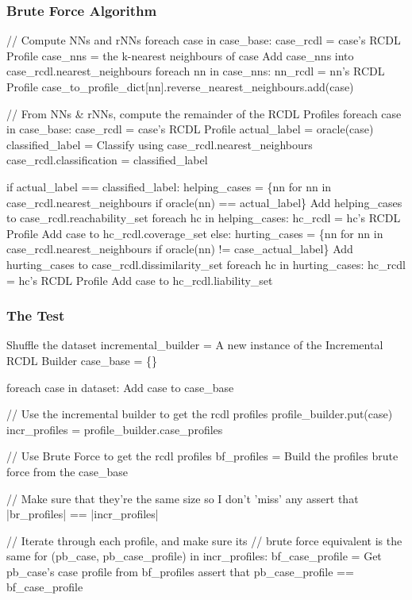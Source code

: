 \documentclass[a4paper,11pt]{report}
\begin{document}
\begin{samepage}
\subsubsection{Brute Force Algorithm}
\begin{code}
// Compute NNs and rNNs
foreach case in case_base:
  case_rcdl = case's RCDL Profile
  case_nns = the k-nearest neighbours of case
  Add case_nns into case_rcdl.nearest_neighbours
  foreach nn in case_nns:
    nn_rcdl = nn's RCDL Profile
    case_to_profile_dict[nn].reverse_nearest_neighbours.add(case)

// From NNs & rNNs, compute the remainder of the RCDL Profiles
foreach case in case_base:
  case_rcdl = case's RCDL Profile
  actual_label = oracle(case)
  classified_label = Classify using case_rcdl.nearest_neighbours
  case_rcdl.classification = classified_label
  
  if actual_label == classified_label:
    helping_cases = \{nn for nn in case_rcdl.nearest_neighbours 
                     if oracle(nn) == actual_label\}
    Add helping_cases to case_rcdl.reachability_set
    foreach hc in helping_cases:
      hc_rcdl = hc's RCDL Profile
      Add case to hc_rcdl.coverage_set
  else:
    hurting_cases = \{nn for nn in case_rcdl.nearest_neighbours 
                     if oracle(nn) != case_actual_label\}
    Add hurting_cases to case_rcdl.dissimilarity_set
    foreach hc in hurting_cases:
      hc_rcdl = hc's RCDL Profile
      Add case to hc_rcdl.liability_set
\end{code}
\end{samepage}

\medspace
\vspace{10pt}

\pagebreak
\subsubsection{The Test}
\nopagebreak[4]
\begin{code}
Shuffle the dataset
incremental_builder = A new instance of the Incremental RCDL Builder
case_base = \{\}

foreach case in dataset:
  Add case to case_base
  
  // Use the incremental builder to get the rcdl profiles
  profile_builder.put(case)
  incr_profiles = profile_builder.case_profiles
  
  // Use Brute Force to get the rcdl profiles
  bf_profiles = Build the profiles brute force from the case_base
  
  // Make sure that they're the same size so I don't 'miss' any
  assert that |br_profiles| == |incr_profiles|
  
  // Iterate through each profile, and make sure its 
  // brute force equivalent is the same
  for (pb_case, pb_case_profile) in incr_profiles:
      bf_case_profile = Get pb_case's case profile from bf_profiles
      assert that pb_case_profile == bf_case_profile
\end{code}
\end{document}
